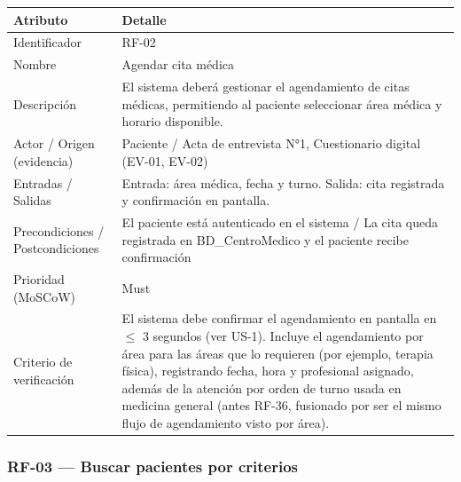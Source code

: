 \documentclass[11pt,a4paper]{article}
\begin{document}
	\begin{longtable}{p{} p{}}
		
		\toprule
		\textbf{Atributo} & \textbf{Detalle} \\
		\midrule
		\endhead
		
		Identificador & RF-02 \\
		Nombre & Agendar cita médica \\
		Descripción & El sistema deberá gestionar el agendamiento de citas médicas, permitiendo al paciente seleccionar área médica y horario disponible. \\
		Actor / Origen (evidencia) & Paciente / Acta de entrevista N°1, Cuestionario digital (EV-01, EV-02) \\
		Entradas / Salidas & Entrada: área médica, fecha y turno. Salida: cita registrada y confirmación en pantalla. \\
		Precondiciones / Postcondiciones & El paciente está autenticado en el sistema / La cita queda registrada en BD\_CentroMedico y el paciente recibe confirmación \\
		Prioridad (MoSCoW) & Must \\
		Criterio de verificación & El sistema debe confirmar el agendamiento en pantalla en \(\leq\) 3 segundos (ver US-1). Incluye el agendamiento por área para las áreas que lo requieren (por ejemplo, terapia física), registrando fecha, hora y profesional asignado, además de la atención por orden de turno usada en medicina general (antes RF-36, fusionado por ser el mismo flujo de agendamiento visto por área). \\
		
		\bottomrule
		
	\end{longtable}
	
	\subsubsection{RF-03 --- Buscar pacientes por criterios}
	
\end{document}

